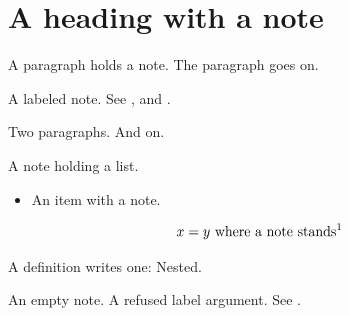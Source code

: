 \flmHeading[toc=true]
\section{A heading with a note}{\flmLabels{\label{ref1}}}

A paragraph holds a note. The paragraph goes on.

A labeled note. See ,  and .

Two paragraphs. And on.

A note holding a list.

\begin{itemize}
\item An item with a note.
\end{itemize}

\begin{equation}
x = y \text{ where a note stands\flmXNfootnote{The formula's note.}}
\end{equation}

A definition writes one: \flmUDnoted{} Nested.

An empty note.\flmXNfootnote{} A refused label argument. See .

